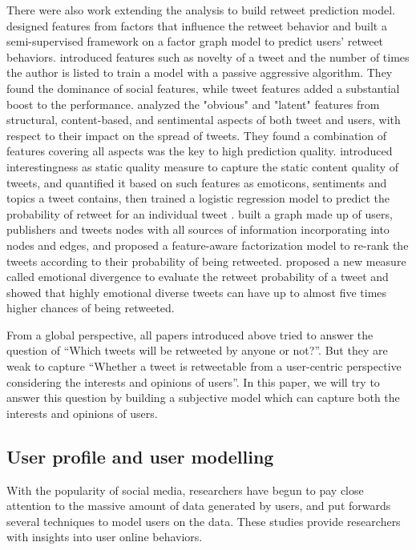 \documentclass{acm_proc_article-sp}
\begin{document}
There were also work extending the analysis to build retweet prediction model. 
\cite{conf/cikm/YangGCTLZS10} designed features from factors that influence the retweet behavior and built a semi-supervised framework on a factor graph model to predict users’ retweet behaviors. 
\cite{Osborne_Lavrenko_2011} introduced features such as novelty of a tweet and the number of times the author is listed to train a model with a passive aggressive algorithm. 
They found the dominance of social features, while tweet features added a substantial boost to the performance.
\cite{Jenders:2013APV} analyzed the "obvious" and "latent" features from structural, content-based, and sentimental aspects of both tweet and users, with respect to their impact on the spread of tweets. 
They found a combination of features covering all aspects was the key to high prediction quality.
\cite{Naveed:2011SMC,2011:NaveedGKC} introduced interestingness as static quality measure to capture the static content quality of tweets, and quantified it based on such features as emoticons, sentiments and topics a tweet contains, then trained a logistic regression model to predict the probability of retweet for an individual tweet .
\cite{conf/wsdm/FengW13} built a graph made up of users, publishers and tweets nodes with all sources of information incorporating into nodes and edges, and proposed a feature-aware factorization model to re-rank the tweets according to their probability of being retweeted.
\cite{conf/icwsm/PfitznerGS12} proposed a new measure called emotional divergence to evaluate the retweet probability of a tweet and showed that highly emotional diverse tweets can have up to almost five times higher chances of being retweeted.

From a global perspective, all papers introduced above tried to answer the question of ``Which tweets will be retweeted by anyone or not?''. 
But they are weak to capture ``Whether a tweet is retweetable from a user-centric perspective considering the interests and opinions of users''. 
In this paper, we will try to answer this question by building a subjective model which can capture both the interests and opinions of users.

\subsection{User profile and user modelling}
With the popularity of social media, researchers have begun to pay close attention to the massive amount of data generated by users, and put forwards several techniques to model users on the data. These studies provide researchers with insights into user online behaviors. 
\end{document}
